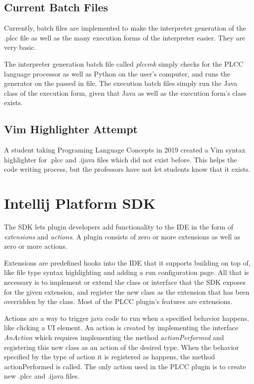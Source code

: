 \documentclass[conference, letterpaper]{IEEEtran}
\begin{document}
\subsection{Current Batch Files}\label{subsec:current-batch-files}
Currently, batch files are implemented to make the interpreter generation of the .plcc file as well as the many execution forms of the interpreter easier.
They are very basic.

The interpreter generation batch file called \textit{plccmk} simply checks for the PLCC language processor as well as Python on the user's computer, and runs the generator on the passed in file.
The execution batch files simply run the Java class of the execution form, given that Java as well as the execution form's class exists.

\subsection{Vim Highlighter Attempt}\label{subsec:vim-highlighter-attempt}
A student taking Programing Language Concepts in 2019 created a Vim syntax highlighter for .plcc and .ijava files which did not exist before.
This helps the code writing process, but the professors have not let students know that it exists.


\section{Intellij Platform SDK}\label{sec:intellij-platform-sdk}
The SDK lets plugin developers add functionality to the IDE in the form of \textit{extensions} and \textit{actions}.
A plugin consists of zero or more extensions as well as zero or more actions.

Extensions are predefined hooks into the IDE that it supports building on top of, like file type syntax highlighting and adding a run configuration page.
All that is necessary is to implement or extend the class or interface that the SDK exposes for the given extension, and register the new class as the extension that has been overridden by the class.
Most of the PLCC plugin's features are extensions.

Actions are a way to trigger java code to run when a specified behavior happens, like clicking a UI element.
An action is created by implementing the interface \textit{AnAction} which requires implementing the method \textit{actionPerformed} and registering this new class as an action of the desired type.
When the behavior specified by the type of action it is registered as happens, the method actionPerformed is called.
The only action used in the PLCC plugin is to create new .plcc and .ijava files.
\end{document}
